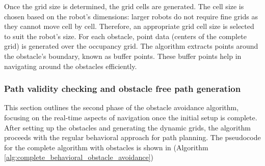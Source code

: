 \vspace{3mm}  


Once the grid size is determined, the grid cells are generated. The cell size is chosen based on the robot's dimensions: larger robots do not require fine grids as they cannot move cell by cell. Therefore, an appropriate grid cell size is selected to suit the robot's size. For each obstacle, point data (centers of the complete grid) is generated over the occupancy grid. The algorithm extracts points around the obstacle's boundary, known as buffer points. These buffer points help in navigating around the obstacles efficiently.



\subsubsection{Path validity checking and obstacle free path generation}

This section outlines the second phase of the obstacle avoidance algorithm, focusing on the real-time aspects of navigation once the initial setup is complete. After setting up the obstacles and generating the dynamic grids, the algorithm proceeds with the regular behavioral approach for path planning. The pseudocode for the complete algorithm with obstacles is shown in (Algorithm \autoref{alg:complete_behavioral_obstacle_avoidance})





